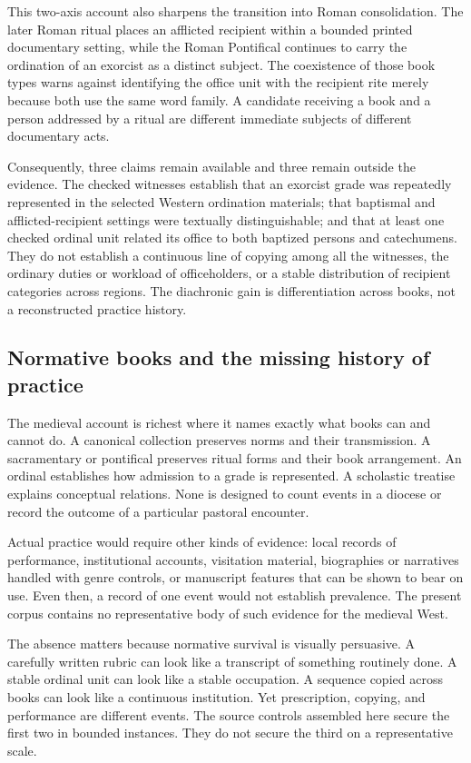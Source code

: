 This two-axis account also sharpens the transition into Roman consolidation.
The later Roman ritual places an afflicted recipient within a bounded
printed documentary setting, while the Roman Pontifical continues to carry
the ordination of an exorcist as a distinct subject. The coexistence of those
book types warns against identifying the office unit with the recipient rite
merely because both use the same word family. A candidate receiving a book
and a person addressed by a ritual are different immediate subjects of
different documentary acts.

Consequently, three claims remain available and three remain outside the
evidence. The checked witnesses establish that an exorcist grade was repeatedly
represented in the selected Western ordination materials; that baptismal and
afflicted-recipient settings were textually distinguishable; and that at
least one checked ordinal unit related its office to both baptized persons
and catechumens. They do not establish a continuous line of copying among all
the witnesses, the ordinary duties or workload of officeholders, or a stable
distribution of recipient categories across regions. The diachronic gain is
differentiation across books, not a reconstructed practice history.

\subsection{Normative books and the missing history of practice}

The medieval account is richest where it names exactly what books can and
cannot do. A canonical collection preserves norms and their transmission. A
sacramentary or pontifical preserves ritual forms and their book arrangement.
An ordinal establishes how admission to a grade is represented. A scholastic
treatise explains conceptual relations. None is designed to count events in a
diocese or record the outcome of a particular pastoral encounter.

Actual practice would require other kinds of evidence: local records of
performance, institutional accounts, visitation material, biographies or
narratives handled with genre controls, or manuscript features that can be
shown to bear on use. Even then, a record of one event would not establish
prevalence. The present corpus contains no representative body of such
evidence for the medieval West.

The absence matters because normative survival is visually persuasive. A
carefully written rubric can look like a transcript of something routinely
done. A stable ordinal unit can look like a stable occupation. A sequence
copied across books can look like a continuous institution. Yet prescription,
copying, and performance are different events. The source controls assembled
here secure the first two in bounded instances. They do not secure the third
on a representative scale.

